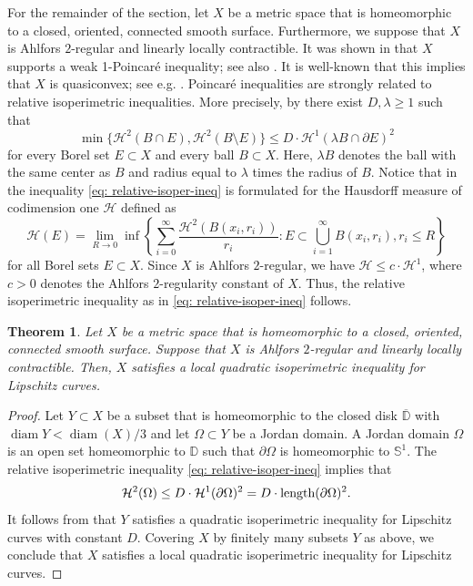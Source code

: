 \documentclass{amsart}
\newtheorem{theorem}{Theorem}[section]
\numberwithin{equation}{section}
\newcommand{\Ha}{\mathcal{H}}
\newcommand{\diam}{\operatorname{diam}}
\DeclareMathOperator{\len}{\textup{length}}
\begin{document}
        For the remainder of the section, let $X$ be a metric space that is homeomorphic to a closed, oriented, connected smooth surface. Furthermore, we suppose that $X$ is Ahlfors $2$-regular and linearly locally contractible. It was shown in \cite{semmes-1996} that $X$ supports a weak 1-Poincar\'e inequality; see also \cite[Corollary 1.6]{basso2023geometric}. It is well-known that this implies that $X$ is quasiconvex; see e.g. \cite[Theorem 8.3.2]{Heinonen-Koskela-Shanmugalingam-Tyson-2015}. Poincar\'e inequalities are strongly related to relative isoperimetric inequalities. More precisely, by \cite[Theorem 1.1]{korte} there exist $D,\lambda\geq 1$ such that
        \begin{equation}\label{eq: relative-isoper-ineq}
            \min\{\Ha^2(B\cap E), \Ha^2(B\setminus E) \} \leq D \cdot \Ha^{1}(\lambda B \cap \partial E)^2
        \end{equation}
        for every Borel set $E \subset X$ and every ball $B\subset X$. Here, $\lambda B$ denotes the ball with the same center as $B$ and radius equal to $\lambda$ times the radius of $B$. Notice that in \cite{korte} the inequality \eqref{eq: relative-isoper-ineq} is formulated for the Hausdorff measure of codimension one $\Ha$ defined as
        $$\Ha(E) = \lim_{R\to 0} \inf\left\{\sum_{i=0}^\infty \frac{\Ha^2(B(x_i,r_i))}{r_i} \colon E \subset \bigcup_{i=1}^\infty B(x_i,r_i), r_i \leq R \right\}$$
        for all Borel sets $E \subset X$. Since $X$ is Ahlfors $2$-regular, we have $\Ha \leq c \cdot \Ha^1$, where $c>0$ denotes the Ahlfors $2$-regularity constant of $X$. Thus, the relative isoperimetric inequality as in \eqref{eq: relative-isoper-ineq} follows.

        \begin{theorem}\label{thme: small-mass-isop-ahlfors-llc}
            Let $X$ be a metric space that is homeomorphic to a closed, oriented, connected smooth surface. Suppose that $X$ is Ahlfors $2$-regular and linearly locally contractible. Then, $X$ satisfies a local quadratic isoperimetric inequality for Lipschitz curves.
        \end{theorem}

        \begin{proof}
            Let $Y \subset X$ be a subset that is homeomorphic to the closed disk $\overline{\mathbb{D}}$ with $\diam Y < \diam (X)/3$ and let $\Omega \subset Y$ be a Jordan domain. A Jordan domain $\Omega$ is an open set homeomorphic to $\mathbb{D}$ such that $\partial\Omega$ is homeomorphic to $\mathbb{S}^1$. The relative isoperimetric inequality \eqref{eq: relative-isoper-ineq} implies that
            $$\Ha^2(\Omega) \leq D \cdot \Ha^1(\partial \Omega)^2 = D \cdot \len(\partial \Omega)^2.$$
            It follows from \cite[Theorem 1.4]{Lytchack-wenger-Canonical-parameterizations} that $Y$ satisfies a quadratic isoperimetric inequality for Lipschitz curves with constant $D$. Covering $X$ by finitely many subsets $Y$ as above, we conclude that $X$ satisfies a local quadratic isoperimetric inequality for Lipschitz curves.
        \end{proof}
\end{document}
